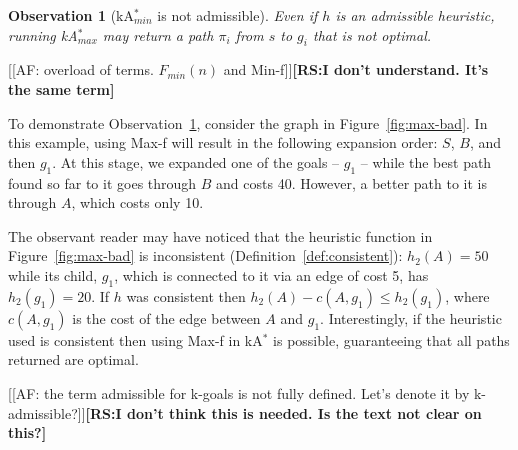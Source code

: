 \documentclass{aicom2e}
\newtheorem{observation}{Observation}
\newcommand{\kastar}{kA$^*$}
\newcommand{\kastarmin}{kA$^*_{min}$}
\newcommand{\kastarmax}{kA$^*_{max}$}
\newcommand{\minf}{Min-f}
\newcommand{\maxf}{Max-f}
\newcommand{\roni}[1]{\textbf{[RS:#1]}}
\begin{document}
 \begin{observation}[\kastarmin{} is not admissible]
 	Even if $h$ is an admissible heuristic, 
 	running \kastarmax{} may return a path $\pi_i$ from $s$ to $g_i$ that is not optimal. 
 	\label{obs:max-f-inadmissible}
 \end{observation}
[[AF: overload of terms. $F_{min}(n)$ and \minf{}]]\roni{I don't understand. It's the same term}

To demonstrate Observation~\ref{obs:max-f-inadmissible}, consider the graph in Figure~\ref{fig:max-bad}.
 In this example, using \maxf{} will result in the following expansion order: $S$, $B$, and then $g_1$. At this stage, we expanded one of the goals -- $g_1$ -- while the best path found so far to it goes through $B$ and costs 40. However, a better path to it is through $A$, which costs only 10.
 
 
  The observant reader may have noticed that the heuristic function in Figure~\ref{fig:max-bad} is inconsistent (Definition~\ref{def:consistent}): $h_2(A)=50$ while its child, $g_1$, which is connected to it via an edge of cost 5, has $h_2(g_1)=20$. If $h$ was consistent then $h_2(A)-c(A,g_1)\leq h_2(g_1)$, where $c(A,g_1)$ is the cost of the edge between $A$ and $g_1$. 
  Interestingly, if the heuristic used is consistent then using \maxf{} in \kastar{} is possible, guaranteeing that all paths returned are optimal. %
 
 [[AF: the term admissible for k-goals is not fully defined. Let's denote it by k-admissible?]]\roni{I don't think this is needed. Is the text not clear on this?}
 
\end{document}
